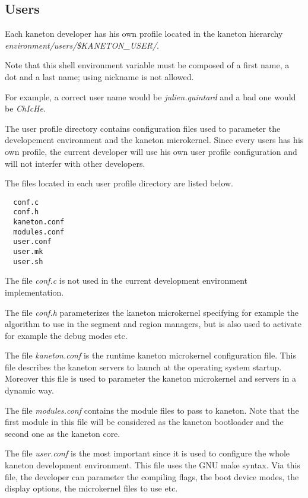 %
%

\subsection{Users}

Each kaneton developer has his own profile located in the kaneton
hierarchy \textit{environment/users/\$KANETON\_USER/}.

Note that this shell environment variable must be composed of a
first name, a dot and a last name; using nickname is not allowed.

For example, a correct user name would be \textit{julien.quintard} and
a bad one would be \textit{ChIcHe}.

The user profile directory contains configuration files used to parameter
the developement environment and the kaneton microkernel. Since every
users has his own profile, the current developer will use his own user
profile configuration and will not interfer with other developers.

The files located in each user profile directory are listed below.

\begin{verbatim}
  conf.c
  conf.h
  kaneton.conf
  modules.conf
  user.conf
  user.mk
  user.sh
\end{verbatim}

The file \textit{conf.c} is not used in the current development environment
implementation.

The file \textit{conf.h} parameterizes the kaneton microkernel specifying
for example the algorithm to use in the segment and region managers,
but is also used to activate for example the debug modes etc.

The file \textit{kaneton.conf} is the runtime kaneton microkernel
configuration file. This file describes the kaneton servers to launch
at the operating system startup. Moreover this file is used to parameter
the kaneton microkernel and servers in a dynamic way.

The file \textit{modules.conf} contains the module files to pass to
kaneton. Note that the first module in this file will be considered as
the kaneton bootloader and the second one as the kaneton core.

The file \textit{user.conf} is the most important since it is used
to configure the whole kaneton development environment. This file uses
the GNU make syntax. Via this file, the developer can parameter the compiling
flags, the boot device modes, the display options, the microkernel
files to use etc.

